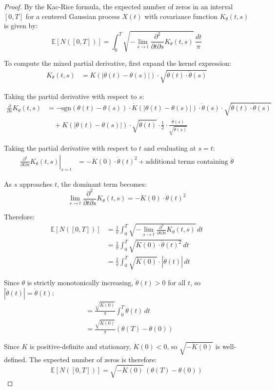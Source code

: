 \documentclass{article}
\newcommand{\EE}{\mathbb{E}}
\newcommand{\dottheta}{\dot{\theta}}
\begin{document}
\begin{proof}
By the Kac-Rice formula, the expected number of zeros in an interval $[0,T]$ for a centered Gaussian process $X(t)$ with covariance function $K_\theta(t,s)$ is given by:
\begin{equation}
\EE[N([0,T])] = \int_0^T \sqrt{-\lim_{s\to t} \frac{\partial^2}{\partial t \partial s} K_\theta(t,s)} \, \frac{dt}{\pi}
\end{equation}

To compute the mixed partial derivative, first expand the kernel expression:
\begin{align}
K_\theta(t,s) &= K(|\theta(t)-\theta(s)|) \cdot \sqrt{\dottheta(t) \cdot \dottheta(s)}
\end{align}

Taking the partial derivative with respect to $s$:
\begin{align}
\frac{\partial}{\partial s}K_\theta(t,s) &= -\text{sgn}(\theta(t)-\theta(s)) \cdot \dot{K}(|\theta(t)-\theta(s)|) \cdot \dottheta(s) \cdot \sqrt{\dottheta(t) \cdot \dottheta(s)}\\
&\quad + K(|\theta(t)-\theta(s)|) \cdot \sqrt{\dottheta(t)} \cdot \frac{1}{2} \cdot \frac{\ddot{\theta}(s)}{\sqrt{\dottheta(s)}}
\end{align}

Taking the partial derivative with respect to $t$ and evaluating at $s=t$:
\begin{align}
\left.\frac{\partial^2}{\partial t \partial s}K_\theta(t,s)\right|_{s=t} &= -\ddot{K}(0) \cdot \dottheta(t)^2 + \text{additional terms containing } \ddot{\theta}
\end{align}

As $s$ approaches $t$, the dominant term becomes:
\begin{equation}
\lim_{s\to t} \frac{\partial^2}{\partial t \partial s} K_\theta(t,s) = -\ddot{K}(0) \cdot \dottheta(t)^2
\end{equation}

Therefore:
\begin{align}
\EE[N([0,T])] &= \frac{1}{\pi}\int_0^T \sqrt{-\lim_{s\to t} \frac{\partial^2}{\partial t \partial s} K_\theta(t,s)} \, dt\\
&= \frac{1}{\pi}\int_0^T \sqrt{\ddot{K}(0) \cdot \dottheta(t)^2} \, dt\\
&= \frac{1}{\pi}\int_0^T \sqrt{\ddot{K}(0)} \cdot |\dottheta(t)| \, dt
\end{align}

Since $\theta$ is strictly monotonically increasing, $\dottheta(t) > 0$ for all $t$, so $|\dottheta(t)| = \dottheta(t)$:
\begin{align}
&= \frac{\sqrt{\ddot{K}(0)}}{\pi} \int_0^T \dottheta(t) \, dt\\
&= \frac{\sqrt{\ddot{K}(0)}}{\pi} (\theta(T) - \theta(0))
\end{align}

Since $K$ is positive-definite and stationary, $\ddot{K}(0) < 0$, so $\sqrt{-\ddot{K}(0)}$ is well-defined. The expected number of zeros is therefore:
\begin{equation}
\EE[N([0,T])] = \sqrt{-\ddot{K}(0)} \, (\theta(T)-\theta(0))
\end{equation}
\end{proof}
\end{document}
